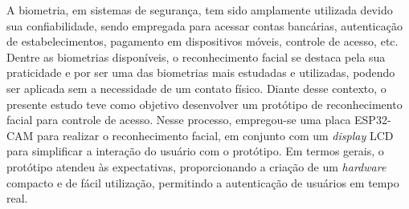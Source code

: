 
\begin{resumoutfpr}%
	A biometria, em sistemas de segurança, tem sido amplamente utilizada devido sua 
	confiabilidade, sendo empregada para acessar contas bancárias, autenticação de 
	estabelecimentos, pagamento em dispositivos móveis, controle de acesso, etc. 
	Dentre as biometrias disponíveis, o reconhecimento facial se destaca pela sua 
	praticidade e por ser uma das biometrias mais estudadas e utilizadas, 
	podendo ser aplicada sem a necessidade de um contato físico. Diante desse contexto,  
	o presente estudo teve como objetivo desenvolver um protótipo de reconhecimento facial 
	para controle de acesso. Nesse processo, empregou-se uma placa ESP32-CAM para 
	realizar o reconhecimento facial, em conjunto com um \textit{display} LCD para simplificar 
	a interação do usuário com o protótipo.  Em termos gerais, o protótipo atendeu às 
	expectativas, proporcionando a criação de um \textit{hardware} compacto e de fácil utilização, 
	permitindo a autenticação de usuários em tempo real.
\end{resumoutfpr}
	